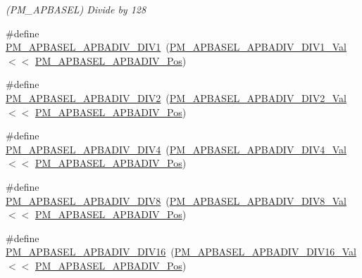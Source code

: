 \begin{DoxyCompactItemize}
\begin{DoxyCompactList}\small\item\em (P\+M\+\_\+\+A\+P\+B\+A\+S\+EL) Divide by 128 \end{DoxyCompactList}\item 
\#define \mbox{\hyperlink{group___s_a_m_d21___p_m_gac598b749bd49aa820ebd602e90c36398}{P\+M\+\_\+\+A\+P\+B\+A\+S\+E\+L\+\_\+\+A\+P\+B\+A\+D\+I\+V\+\_\+\+D\+I\+V1}}~(\mbox{\hyperlink{group___s_a_m_d21___p_m_ga8a305c10594a48164ea69840686ea687}{P\+M\+\_\+\+A\+P\+B\+A\+S\+E\+L\+\_\+\+A\+P\+B\+A\+D\+I\+V\+\_\+\+D\+I\+V1\+\_\+\+Val}}   $<$$<$ \mbox{\hyperlink{group___s_a_m_d21___p_m_gab10103778b1cfc844b25db57307010e6}{P\+M\+\_\+\+A\+P\+B\+A\+S\+E\+L\+\_\+\+A\+P\+B\+A\+D\+I\+V\+\_\+\+Pos}})
\item 
\#define \mbox{\hyperlink{group___s_a_m_d21___p_m_ga192cfdefac33689e4c46b28456824abd}{P\+M\+\_\+\+A\+P\+B\+A\+S\+E\+L\+\_\+\+A\+P\+B\+A\+D\+I\+V\+\_\+\+D\+I\+V2}}~(\mbox{\hyperlink{group___s_a_m_d21___p_m_gaeb1943a5c678bf949d1a91019469b0fb}{P\+M\+\_\+\+A\+P\+B\+A\+S\+E\+L\+\_\+\+A\+P\+B\+A\+D\+I\+V\+\_\+\+D\+I\+V2\+\_\+\+Val}}   $<$$<$ \mbox{\hyperlink{group___s_a_m_d21___p_m_gab10103778b1cfc844b25db57307010e6}{P\+M\+\_\+\+A\+P\+B\+A\+S\+E\+L\+\_\+\+A\+P\+B\+A\+D\+I\+V\+\_\+\+Pos}})
\item 
\#define \mbox{\hyperlink{group___s_a_m_d21___p_m_ga7cfa405a0443d65cf430c7a2898d5a2b}{P\+M\+\_\+\+A\+P\+B\+A\+S\+E\+L\+\_\+\+A\+P\+B\+A\+D\+I\+V\+\_\+\+D\+I\+V4}}~(\mbox{\hyperlink{group___s_a_m_d21___p_m_ga3ab1c2dd45cdeda0a30df9c3e060e558}{P\+M\+\_\+\+A\+P\+B\+A\+S\+E\+L\+\_\+\+A\+P\+B\+A\+D\+I\+V\+\_\+\+D\+I\+V4\+\_\+\+Val}}   $<$$<$ \mbox{\hyperlink{group___s_a_m_d21___p_m_gab10103778b1cfc844b25db57307010e6}{P\+M\+\_\+\+A\+P\+B\+A\+S\+E\+L\+\_\+\+A\+P\+B\+A\+D\+I\+V\+\_\+\+Pos}})
\item 
\#define \mbox{\hyperlink{group___s_a_m_d21___p_m_ga44bb038376793ebb55d376f8f650e021}{P\+M\+\_\+\+A\+P\+B\+A\+S\+E\+L\+\_\+\+A\+P\+B\+A\+D\+I\+V\+\_\+\+D\+I\+V8}}~(\mbox{\hyperlink{group___s_a_m_d21___p_m_ga003b309e1ea26ef35d9d56d66139f05f}{P\+M\+\_\+\+A\+P\+B\+A\+S\+E\+L\+\_\+\+A\+P\+B\+A\+D\+I\+V\+\_\+\+D\+I\+V8\+\_\+\+Val}}   $<$$<$ \mbox{\hyperlink{group___s_a_m_d21___p_m_gab10103778b1cfc844b25db57307010e6}{P\+M\+\_\+\+A\+P\+B\+A\+S\+E\+L\+\_\+\+A\+P\+B\+A\+D\+I\+V\+\_\+\+Pos}})
\item 
\#define \mbox{\hyperlink{group___s_a_m_d21___p_m_gaff6c3bc9d5409d2ca232c654fa080c8d}{P\+M\+\_\+\+A\+P\+B\+A\+S\+E\+L\+\_\+\+A\+P\+B\+A\+D\+I\+V\+\_\+\+D\+I\+V16}}~(\mbox{\hyperlink{group___s_a_m_d21___p_m_ga9a16dcd1b5997aa13f799849c76bd2e5}{P\+M\+\_\+\+A\+P\+B\+A\+S\+E\+L\+\_\+\+A\+P\+B\+A\+D\+I\+V\+\_\+\+D\+I\+V16\+\_\+\+Val}}  $<$$<$ \mbox{\hyperlink{group___s_a_m_d21___p_m_gab10103778b1cfc844b25db57307010e6}{P\+M\+\_\+\+A\+P\+B\+A\+S\+E\+L\+\_\+\+A\+P\+B\+A\+D\+I\+V\+\_\+\+Pos}})
$$
\end{DoxyCompactItemize}
